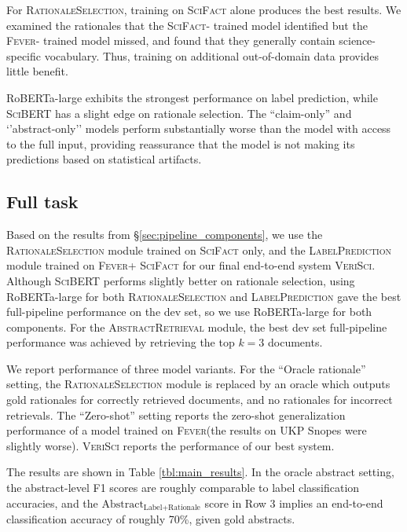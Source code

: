 \documentclass[11pt,a4paper]{article}
\newcommand{\ours}{\textsc{SciFact}\xspace}
\newcommand{\sysname}{\textsc{VeriSci}\xspace}
\newcommand{\fever}{\textsc{Fever}\xspace}
\newcommand{\snopes}{UKP Snopes\xspace}
\newcommand{\scibert}{\textsc{SciBERT}\xspace}
\newcommand{\robertalarge}{RoBERTa-large\xspace}
\newcommand{\abstractLabelRationale}{$\textrm{Abstract}_{\textrm{Label+Rationale}}$\xspace}
\newcommand{\componentone}{\textsc{AbstractRetrieval}\xspace}
\newcommand{\componenttwo}{\textsc{RationaleSelection}\xspace}
\newcommand{\componentthree}{\textsc{LabelPrediction}\xspace}
\begin{document}
For \componenttwo, training on \ours alone produces the best results. We examined the rationales that the \ours - trained model identified but the \fever - trained model missed, and found that they generally contain science-specific vocabulary. Thus, training on additional out-of-domain data provides little benefit.

\robertalarge exhibits the strongest performance on label prediction, while \scibert has a slight edge on rationale selection. The ``claim-only'' and `'abstract-only'' models perform substantially worse than the model with access to the full input, providing reassurance that the model is not making its predictions based on statistical artifacts.



\subsection{Full task} \label{sec:main_results}
Based on the results from \S\ref{sec:pipeline_components}, we use the \componenttwo module trained on \ours only, and the \componentthree module trained on \fever + \ours for our final end-to-end system \sysname. Although \scibert performs slightly better on rationale selection, using \robertalarge for both \componenttwo and \componentthree gave the best full-pipeline performance on the dev set, so we use \robertalarge for both components. For the \componentone module, the best dev set full-pipeline performance was achieved by retrieving the top $k=3$ documents. 

\vspace{.2cm}
We report performance of three model variants. For the ``Oracle rationale'' setting, the \componenttwo module is replaced by an oracle which outputs gold rationales for correctly retrieved documents, and no rationales for incorrect retrievals. The ``Zero-shot'' setting reports the zero-shot generalization performance of a model trained on \fever (the results on \snopes were slightly worse). \sysname reports the performance of our best system.


\vspace{.2cm}
The results are shown in Table \ref{tbl:main_results}. In the oracle abstract setting, the abstract-level F1 scores are roughly comparable to label classification accuracies, and the \abstractLabelRationale score in Row 3 implies an end-to-end classification accuracy of roughly 70\%, given gold abstracts.
\end{document}
